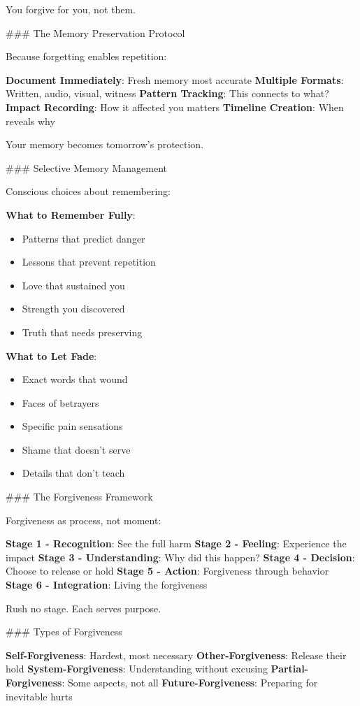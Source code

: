 \documentclass[12pt]{book}
\begin{document}
You forgive for you, not them.

\#\#\# The Memory Preservation Protocol

Because forgetting enables repetition:

\textbf{Document Immediately}: Fresh memory most accurate
\textbf{Multiple Formats}: Written, audio, visual, witness
\textbf{Pattern Tracking}: This connects to what?
\textbf{Impact Recording}: How it affected you matters
\textbf{Timeline Creation}: When reveals why

Your memory becomes tomorrow's protection.

\#\#\# Selective Memory Management

Conscious choices about remembering:

\textbf{What to Remember Fully}:
\begin{itemize}
\item Patterns that predict danger
\item Lessons that prevent repetition
\item Love that sustained you
\item Strength you discovered
\item Truth that needs preserving

\end{itemize}
\textbf{What to Let Fade}:
\begin{itemize}
\item Exact words that wound
\item Faces of betrayers
\item Specific pain sensations
\item Shame that doesn't serve
\item Details that don't teach

\end{itemize}
\#\#\# The Forgiveness Framework

Forgiveness as process, not moment:

\textbf{Stage 1 - Recognition}: See the full harm
\textbf{Stage 2 - Feeling}: Experience the impact
\textbf{Stage 3 - Understanding}: Why did this happen?
\textbf{Stage 4 - Decision}: Choose to release or hold
\textbf{Stage 5 - Action}: Forgiveness through behavior
\textbf{Stage 6 - Integration}: Living the forgiveness

Rush no stage. Each serves purpose.

\#\#\# Types of Forgiveness

\textbf{Self-Forgiveness}: Hardest, most necessary
\textbf{Other-Forgiveness}: Release their hold
\textbf{System-Forgiveness}: Understanding without excusing
\textbf{Partial-Forgiveness}: Some aspects, not all
\textbf{Future-Forgiveness}: Preparing for inevitable hurts
\end{document}
